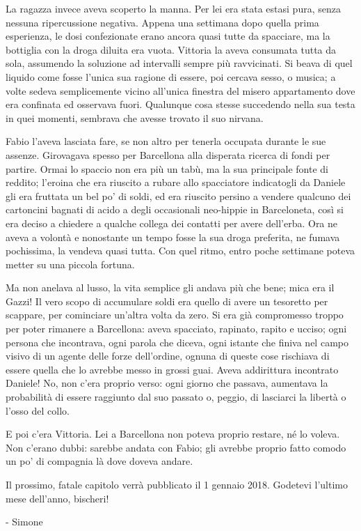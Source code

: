 La ragazza invece aveva scoperto la manna. Per lei era stata estasi pura, senza nessuna ripercussione negativa. Appena una settimana dopo quella prima esperienza, le dosi confezionate erano ancora quasi tutte da spacciare, ma la bottiglia con la droga diluita era vuota. Vittoria la aveva consumata tutta da sola, assumendo la soluzione ad intervalli sempre più ravvicinati. Si beava di quel liquido come fosse l'unica sua ragione di essere, poi cercava sesso, o musica; a volte sedeva semplicemente vicino all'unica finestra del misero appartamento dove era confinata ed osservava fuori. Qualunque cosa stesse succedendo nella sua testa in quei momenti, sembrava che avesse trovato il suo nirvana.

Fabio l'aveva lasciata fare, se non altro per tenerla occupata durante le sue assenze. Girovagava spesso per Barcellona alla disperata ricerca di fondi per partire. Ormai lo spaccio non era più un tabù, ma la sua principale fonte di reddito; l'eroina che era riuscito a rubare allo spacciatore indicatogli da Daniele gli era fruttata un bel po' di soldi, ed era riuscito persino a vendere qualcuno dei cartoncini bagnati di acido a degli occasionali neo-hippie in Barceloneta, così si era deciso a chiedere a qualche collega dei contatti per avere dell'erba. Ora ne aveva a volontà e nonostante un tempo fosse la sua droga preferita, ne fumava pochissima, la vendeva quasi tutta. Con quel ritmo, entro poche settimane poteva metter su una piccola fortuna.

Ma non anelava al lusso, la vita semplice gli andava più che bene; mica era il Gazzi! Il vero scopo di accumulare soldi era quello di avere un tesoretto per scappare, per cominciare un'altra volta da zero. Si era già compromesso troppo per poter rimanere a Barcellona: aveva spacciato, rapinato, rapito e ucciso; ogni persona che incontrava, ogni parola che diceva, ogni istante che finiva nel campo visivo di un agente delle forze dell'ordine, ognuna di queste cose rischiava di essere quella che lo avrebbe messo in grossi guai. Aveva addirittura incontrato Daniele! No, non c'era proprio verso: ogni giorno che passava, aumentava la probabilità di essere raggiunto dal suo passato o, peggio, di lasciarci la libertà o l'osso del collo.

E poi c'era Vittoria. Lei a Barcellona non poteva proprio restare, né lo voleva. Non c'erano dubbi: sarebbe andata con Fabio; gli avrebbe proprio fatto comodo un po' di compagnia là dove doveva andare.

Il prossimo, fatale capitolo verrà pubblicato il 1 gennaio 2018. Godetevi l'ultimo mese dell'anno, bischeri!

- Simone



